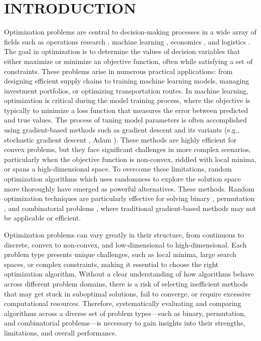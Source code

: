 \section{INTRODUCTION}
Optimization problems are central to decision-making processes in a wide array of fields such as operations research \cite{Padamwar2019},  machine learning \cite{Abdulkadirov2023}\cite{GAMBELLA2021807}, economics \cite{PONSTEIN1984255}, and logistics \cite{GARCIA2015153}. The goal in optimization is to determine the values of decision variables that either maximize or minimize an objective function, often while satisfying a set of constraints. These problems arise in numerous practical applications: from designing efficient supply chains to training machine learning models, managing investment portfolios, or optimizing transportation routes. In machine learning, optimization is critical during the model training process, where the objective is typically to minimize a loss function \cite{Bian2024} that measures the error between predicted and true values. The process of tuning model parameters is often accomplished using gradient-based methods such as gradient descent \cite{Baldi1995} and its variants (e.g., stochastic gradient descent \cite{Tian2023}, Adam \cite{Kingma2014AdamAM}). These methods are highly efficient for convex problems, but they face significant challenges in more complex scenarios, particularly when the objective function \cite{Matsuoka2019} is non-convex, riddled with local minima, or spans a high-dimensional space. To overcome these limitations, random optimization algorithms which uses randomness to explore the solution space more thoroughly have emerged as powerful alternatives. These methods. Random optimization techniques are particularly effective for solving binary \cite{Becerra-Rozas2023}, permutation \cite{Hu2003}, and combinatorial problems \cite{Peres2021}, where traditional gradient-based methods may not be applicable or efficient. 

Optimization problems can vary greatly in their structure, from continuous to discrete, convex to non-convex, and low-dimensional to high-dimensional. Each problem type presents unique challenges, such as local minima, large search spaces, or complex constraints, making it essential to choose the right optimization algorithm. Without a clear understanding of how algorithms behave across different problem domains, there is a risk of selecting inefficient methods that may get stuck in suboptimal solutions, fail to converge, or require excessive computational resources. Therefore, systematically evaluating and comparing algorithms across a diverse set of problem types—such as binary, permutation, and combinatorial problems—is necessary to gain insights into their strengths, limitations, and overall performance.

